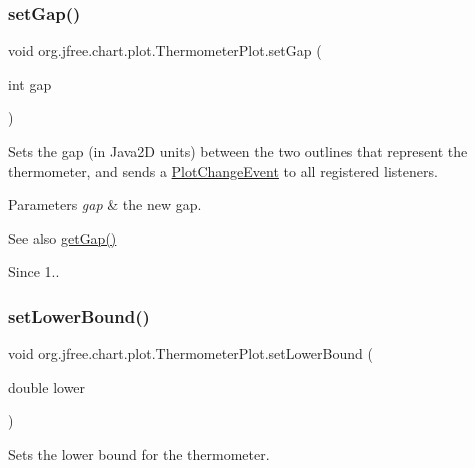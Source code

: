\subsubsection{\texorpdfstring{set\+Gap()}{setGap()}}
{\footnotesize\ttfamily void org.\+jfree.\+chart.\+plot.\+Thermometer\+Plot.\+set\+Gap (\begin{DoxyParamCaption}\item[{int}]{gap }\end{DoxyParamCaption})}

Sets the gap (in Java2D units) between the two outlines that represent the thermometer, and sends a \mbox{\hyperlink{}{Plot\+Change\+Event}} to all registered listeners.


\begin{DoxyParams}{Parameters}
{\em gap} & the new gap.\\
\hline
\end{DoxyParams}
\begin{DoxySeeAlso}{See also}
\mbox{\hyperlink{classorg_1_1jfree_1_1chart_1_1plot_1_1_thermometer_plot_a2a794babab6a5b7b75b792c19b39b3f5}{get\+Gap()}}
\end{DoxySeeAlso}
\begin{DoxySince}{Since}
1.. 
\end{DoxySince}
\mbox{\label{classorg_1_1jfree_1_1chart_1_1plot_1_1_thermometer_plot_a06f3bbb5ab10b9ff9fb9a4a8ba4f70d9}} 
\subsubsection{\texorpdfstring{set\+Lower\+Bound()}{setLowerBound()}}
{\footnotesize\ttfamily void org.\+jfree.\+chart.\+plot.\+Thermometer\+Plot.\+set\+Lower\+Bound (\begin{DoxyParamCaption}\item[{double}]{lower }\end{DoxyParamCaption})}

Sets the lower bound for the thermometer.


